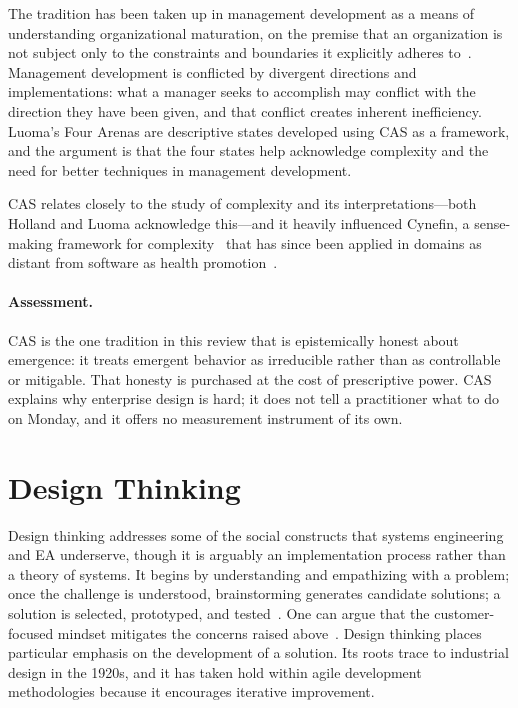 \documentclass[11pt,a4paper]{article}
\begin{document}
The tradition has been taken up in management development as a means of
understanding organizational maturation, on the premise that an organization is
not subject only to the constraints and boundaries it explicitly
adheres to~\citep{luoma2006}. Management development is conflicted by divergent
directions and implementations: what a manager seeks to accomplish may conflict
with the direction they have been given, and that conflict creates inherent
inefficiency. Luoma's Four Arenas are descriptive states developed using CAS as
a framework, and the argument is that the four states help acknowledge
complexity and the need for better techniques in management development.

CAS relates closely to the study of complexity and its interpretations---both
Holland and Luoma acknowledge this---and it heavily influenced Cynefin, a
sense-making framework for complexity~\citep{kurtz2003} that has since been
applied in domains as distant from software as health
promotion~\citep{vanbeurden2011}.

\paragraph{Assessment.} CAS is the one tradition in this review that is
epistemically honest about emergence: it treats emergent behavior as
irreducible rather than as controllable or mitigable. That honesty is purchased
at the cost of prescriptive power. CAS explains why enterprise design is hard;
it does not tell a practitioner what to do on Monday, and it offers no
measurement instrument of its own.

\section{Design Thinking}
\label{sec:dt}

Design thinking addresses some of the social constructs that systems engineering
and EA underserve, though it is arguably an implementation process rather than a
theory of systems. It begins by understanding and empathizing with a problem;
once the challenge is understood, brainstorming generates candidate solutions; a
solution is selected, prototyped, and tested~\citep{dam2024}. One can argue that
the customer-focused mindset mitigates the concerns raised
above~\citep{dunne2018}. Design thinking places particular emphasis on the
development of a solution. Its roots trace to industrial design in the 1920s,
and it has taken hold within agile development methodologies because it
encourages iterative improvement.
\end{document}
